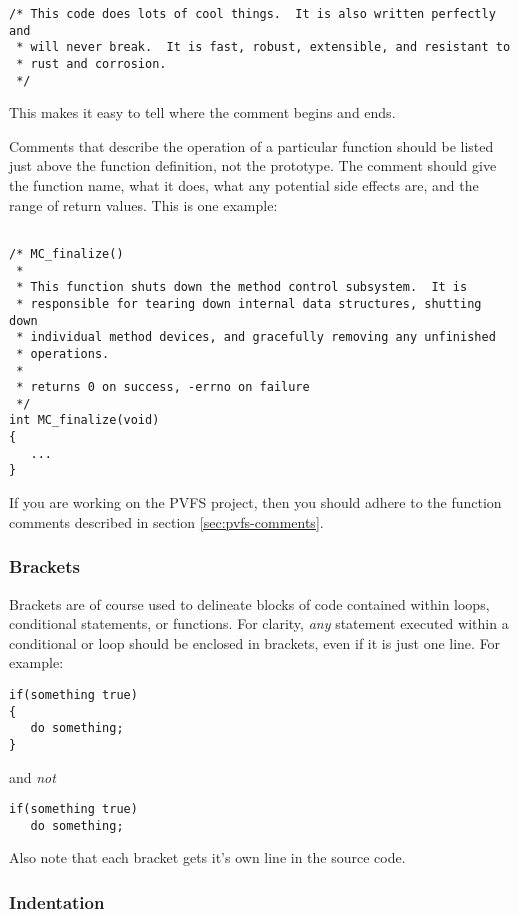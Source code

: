 \documentclass[11pt, letterpaper]{article}
\begin{document}
\begin{verbatim}
/* This code does lots of cool things.  It is also written perfectly and
 * will never break.  It is fast, robust, extensible, and resistant to
 * rust and corrosion.
 */
\end{verbatim}

This makes it easy to tell where the comment begins and ends.

Comments that describe the operation of a particular function should be
listed just above the function definition, not the prototype.  The
comment should give the function name, what it does, what any potential
side effects are, and the range of return values.  This is one example:

\begin{verbatim}

/* MC_finalize()
 *
 * This function shuts down the method control subsystem.  It is
 * responsible for tearing down internal data structures, shutting down
 * individual method devices, and gracefully removing any unfinished
 * operations.
 *
 * returns 0 on success, -errno on failure
 */
int MC_finalize(void)
{
   ...
}
\end{verbatim}

If you are working on the PVFS project, then you should adhere to the
function comments described in section \ref{sec:pvfs-comments}.

\subsubsection{Brackets}

Brackets are of course used to delineate blocks of code contained within
loops, conditional statements, or functions.  For clarity, \emph{any}
statement executed within a conditional or loop should be enclosed in
brackets, even if it is just one line.  For example:

\begin{verbatim}
if(something true)
{
   do something;
}
\end{verbatim}
and \emph{not}
\begin{verbatim}
if(something true) 
   do something;
\end{verbatim}

Also note that each bracket gets it's own line in the source code.  

\subsubsection{Indentation}
\end{document}

